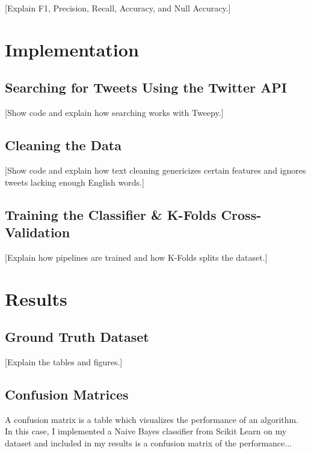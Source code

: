 \documentclass[11pt, twoside, reqno]{book}
\begin{document}
[Explain F1, Precision, Recall, Accuracy, and Null Accuracy.]

\chapter{Implementation}
\label{implementation}

\section{Searching for Tweets Using the Twitter API}
\label{searching_with_api}

[Show code and explain how searching works with Tweepy.]

\section{Cleaning the Data}
\label{cleaning_data}

[Show code and explain how text cleaning genericizes certain features and ignores tweets lacking enough English words.]

\section{Training the Classifier \& K-Folds Cross-Validation}
\label{training_and_k_folds}

[Explain how pipelines are trained and how K-Folds splits the dataset.]

\chapter{Results}
\label{results}

\section{Ground Truth Dataset}
\label{ground_truth_dataset}

[Explain the tables and figures.]

\section{Confusion Matrices}
\label{confusion_matrices}

A confusion matrix is a table which visualizes the performance of an algorithm. In this case, I implemented a Naive Bayes classifier from Scikit Learn on my dataset and included in my results is a confusion matrix of the performance...
\end{document}
